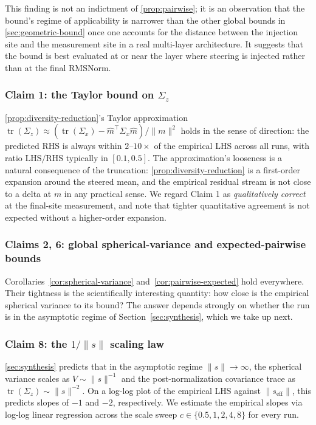 This finding is not an indictment of \ref{prop:pairwise}; it is an observation that the bound's regime of applicability is narrower than the other global bounds in \ref{sec:geometric-bound} once one accounts for the distance between the injection site and the measurement site in a real multi-layer architecture. It suggests that the bound is best evaluated at or near the layer where steering is injected rather than at the final RMSNorm.

\subsubsection{Claim 1: the Taylor bound on $\Sigma_z$}

\ref{prop:diversity-reduction}'s Taylor approximation $\operatorname{tr}(\Sigma_z) \approx (\operatorname{tr}(\Sigma_x) - \hat{m}^\top \Sigma_x \hat{m})/\|m\|^2$ holds in the sense of direction: the predicted RHS is always within $2$--$10\times$ of the empirical LHS across all runs, with ratio $\mathrm{LHS}/\mathrm{RHS}$ typically in $[0.1, 0.5]$. The approximation's looseness is a natural consequence of the truncation: \ref{prop:diversity-reduction} is a first-order expansion around the steered mean, and the empirical residual stream is not close to a delta at $m$ in any practical sense. We regard Claim 1 as \emph{qualitatively correct} at the final-site measurement, and note that tighter quantitative agreement is not expected without a higher-order expansion.

\subsubsection{Claims 2, 6: global spherical-variance and expected-pairwise bounds}

Corollaries~\ref{cor:spherical-variance} and~\ref{cor:pairwise-expected} hold everywhere. Their tightness is the scientifically interesting quantity: how close is the empirical spherical variance to its bound? The answer depends strongly on whether the run is in the asymptotic regime of Section~\ref{sec:synthesis}, which we take up next.

\subsubsection{Claim 8: the $1/\|s\|$ scaling law}
\label{sec:empirical-scaling}

\ref{sec:synthesis} predicts that in the asymptotic regime $\|s\| \to \infty$, the spherical variance scales as $V \sim \|s\|^{-1}$ and the post-normalization covariance trace as $\operatorname{tr}(\Sigma_z) \sim \|s\|^{-2}$. On a log-log plot of the empirical LHS against $\|s_\mathrm{eff}\|$, this predicts slopes of $-1$ and $-2$, respectively. We estimate the empirical slopes via log-log linear regression across the scale sweep $c \in \{0.5, 1, 2, 4, 8\}$ for every run.

